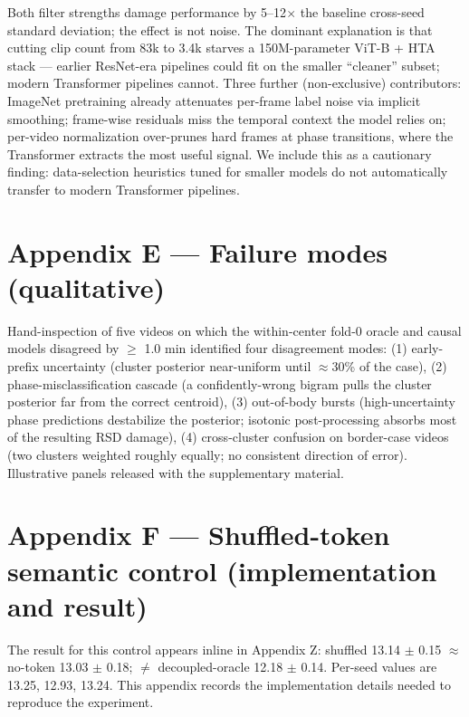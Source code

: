 Both filter strengths damage performance by 5--12$\times$ the baseline
cross-seed standard deviation; the effect is not noise. The dominant
explanation is that cutting clip count from 83k to 3.4k starves a
150M-parameter ViT-B + HTA stack --- earlier ResNet-era pipelines could
fit on the smaller ``cleaner'' subset; modern Transformer pipelines
cannot. Three further (non-exclusive) contributors: ImageNet pretraining
already attenuates per-frame label noise via implicit smoothing;
frame-wise residuals miss the temporal context the model relies on;
per-video normalization over-prunes hard frames at phase transitions,
where the Transformer extracts the most useful signal. We include this
as a cautionary finding: data-selection heuristics tuned for smaller
models do not automatically transfer to modern Transformer pipelines.

\section{Appendix E --- Failure modes (qualitative)}\label{appendix-e-failure-modes-qualitative}

Hand-inspection of five videos on which the within-center fold-0 oracle
and causal models disagreed by $\geq$ 1.0 min identified four disagreement
modes: (1) early-prefix uncertainty (cluster posterior near-uniform
until $\approx$30\% of the case), (2) phase-misclassification cascade (a
confidently-wrong bigram pulls the cluster posterior far from the
correct centroid), (3) out-of-body bursts (high-uncertainty phase
predictions destabilize the posterior; isotonic post-processing absorbs
most of the resulting RSD damage), (4) cross-cluster confusion on
border-case videos (two clusters weighted roughly equally; no consistent
direction of error). Illustrative panels released with the supplementary
material.

\section{Appendix F --- Shuffled-token semantic control (implementation and result)}\label{appendix-f-shuffled-token-semantic-control-implementation-and-result}

The result for this control appears inline in Appendix Z:
shuffled 13.14 $\pm$ 0.15 $\approx$ no-token 13.03 $\pm$ 0.18; $\neq$ decoupled-oracle 12.18
$\pm$ 0.14. Per-seed values are 13.25, 12.93, 13.24. This appendix records
the implementation details needed to reproduce the experiment.

